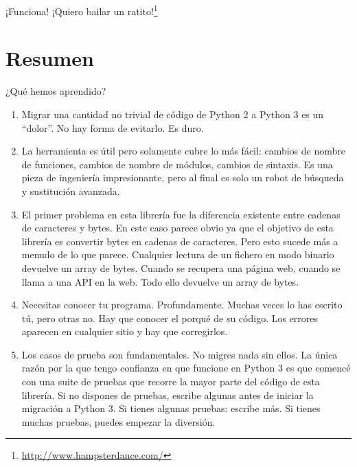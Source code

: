 ¡Funciona! ¡Quiero bailar un ratito!\footnote{\href{http://www.hampsterdance.com/}{http://www.hampsterdance.com/}}

\section{Resumen}

¿Qué hemos aprendido?

\begin{enumerate}
  \item Migrar una cantidad no trivial de código de Python 2 a Python 3 es un ``dolor''. No hay forma de evitarlo. Es duro.
  \item La herramienta  es útil pero solamente cubre lo más fácil: cambios de nombre de funciones, cambios de nombre de módulos, cambios de sintaxis. Es una pieza de ingeniería impresionante, pero al final es solo un robot de búsqueda y sustitución avanzada.
   \item El primer problema en esta librería fue la diferencia existente entre cadenas de caracteres y bytes. En este caso parece obvio ya que el objetivo de esta librería es convertir bytes en cadenas de caracteres. Pero esto sucede más a menudo de lo que parece. Cualquier lectura de un fichero en modo binario devuelve un array de bytes. Cuando se recupera una página web, cuando se llama a una API en la web. Todo ello devuelve un array de bytes.

    \item Necesitas conocer tu programa. Profundamente. Muchas veces lo has escrito tú, pero otras no. Hay que conocer el porqué de su código. Los errores aparecen en cualquier sitio y hay que corregirlos.
    \item Los casos de prueba son fundamentales. No migres nada sin ellos. La única razón por la que tengo confianza en que  funcione en Python 3 es que comencé con una suite de pruebas que recorre la mayor parte del código de esta librería. Si no dispones de pruebas, escribe algunas antes de iniciar la migración a Python 3. Si tienes algunas pruebas: escribe más. Si tienes muchas pruebas, puedes empezar la diversión.

\end{enumerate}
